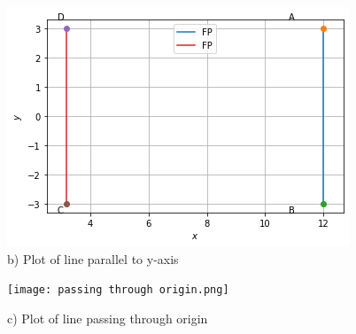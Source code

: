 \documentclass[journal,12pt,twocolumn]{IEEEtran}
\begin{document}
\begin{figure}[!h]
         \centering
         \includegraphics[width=\columnwidth]{parallel to y axis.png}
         \caption{b) Plot of line parallel to y-axis}
         \label{Figure}
\end{figure}
\begin{figure}[!h]
         \centering
         \texttt{[image: passing through origin.png]}
         \caption{c) Plot of line passing through origin}
         \label{Figure}
\end{figure}
\end{document}
